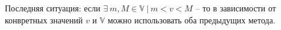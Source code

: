\vspace{0.5in}

Последняя ситуация: если $\exists \ m, M \in \mathbb{V} \ | \ m < v < M$ -- то в зависимости от конвретных значений $v$ и $\mathbb{V}$ можно использовать оба предыдущих метода.








































































































